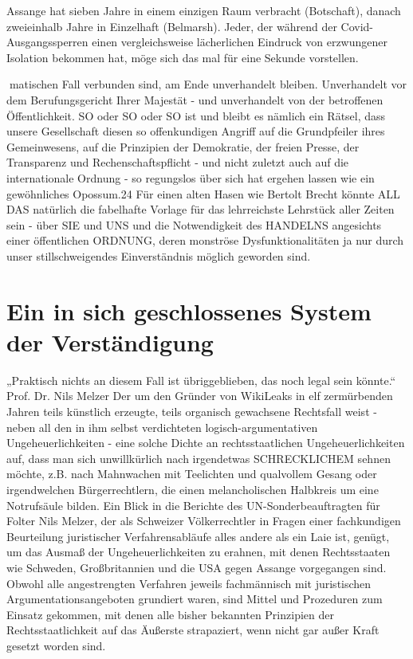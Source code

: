 \begin{multicols}{2}
Assange hat sieben Jahre in einem einzigen Raum verbracht (Botschaft), danach zweieinhalb Jahre in Einzelhaft (Belmarsh). Jeder, der während der Covid-Ausgangssperren einen vergleichsweise lächerlichen Eindruck
von erzwungener Isolation bekommen hat, möge sich das mal für eine Sekunde vorstellen.

matischen Fall verbunden sind, am Ende unverhandelt
bleiben. Unverhandelt vor dem Berufungsgericht Ihrer
Majestät - und unverhandelt von der betroffenen Öffentlichkeit.
SO oder SO oder SO ist und bleibt es nämlich ein Rätsel,
dass unsere Gesellschaft diesen so offenkundigen Angriff
auf die Grundpfeiler ihres Gemeinwesens, auf die Prinzipien der Demokratie, der freien Presse, der Transparenz
und Rechenschaftspflicht - und nicht zuletzt auch auf
die internationale Ordnung - so regungslos über sich hat
ergehen lassen wie ein gewöhnliches Opossum.24
Für einen alten Hasen wie Bertolt Brecht könnte ALL
DAS natürlich die fabelhafte Vorlage für das lehrreichste
Lehrstück aller Zeiten sein - über SIE und UNS und die
Notwendigkeit des HANDELNS angesichts einer öffentlichen ORDNUNG, deren monströse Dysfunktionalitäten ja nur durch unser stillschweigendes Einverständnis
möglich geworden sind.



\chapter{Ein in sich geschlossenes System der Verständigung} %
„Praktisch nichts an diesem Fall ist übriggeblieben,
das noch legal sein könnte.“
Prof. Dr. Nils Melzer
Der um den Gründer von WikiLeaks in elf zermürbenden Jahren teils künstlich erzeugte, teils organisch gewachsene Rechtsfall weist - neben all den in ihm selbst
verdichteten logisch-argumentativen Ungeheuerlichkeiten - eine solche Dichte an rechtsstaatlichen Ungeheuerlichkeiten auf, dass man sich unwillkürlich nach
irgendetwas SCHRECKLICHEM sehnen möchte, z.B.
nach Mahnwachen mit Teelichten und qualvollem Gesang oder irgendwelchen Bürgerrechtlern, die einen melancholischen Halbkreis um eine Notrufsäule bilden.
Ein Blick in die Berichte des UN-Sonderbeauftragten für
Folter Nils Melzer, der als Schweizer Völkerrechtler in
Fragen einer fachkundigen Beurteilung juristischer Verfahrensabläufe alles andere als ein Laie ist, genügt, um
das Ausmaß der Ungeheuerlichkeiten zu erahnen, mit
denen Rechtsstaaten wie Schweden, Großbritannien
und die USA gegen Assange vorgegangen sind. Obwohl
alle angestrengten Verfahren jeweils fachmännisch mit
juristischen Argumentationsangeboten grundiert waren, sind Mittel und Prozeduren zum Einsatz gekommen, mit denen alle bisher bekannten Prinzipien der
Rechtsstaatlichkeit auf das Äußerste strapaziert, wenn
nicht gar außer Kraft gesetzt worden sind.


\end{multicols}
